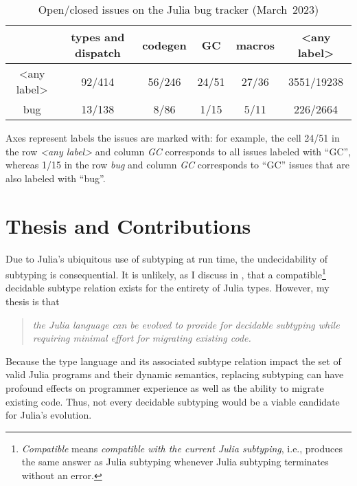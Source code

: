 \begin{table}[t]
\begin{threeparttable}
\centering\footnotesize
\caption{Open/closed issues on the Julia bug tracker
(March~2023)}\label{tab:julia-issues-stats}

\begin{tabular}{c|ccccc}
 & types and dispatch & codegen & GC & macros & <any label> \\
\midrule
<any label> &
  92/414 & 56/246 & 24/51 & 27/36 & 3551/19238 \\
bug &
  13/138 & 8/86 & 1/15 & 5/11 & 226/2664
\end{tabular}

\begin{tablenotes}[para]
\small
Axes represent labels the issues are marked with: for example, the cell
24/51 in the row \emph{<any label>} and column \emph{GC} corresponds to all
issues labeled with {``GC''}, whereas 1/15 in the row \emph{bug} and column 
\emph{GC} corresponds to {``GC''} issues that are also labeled with {``bug''}.
\end{tablenotes}
\end{threeparttable}
\end{table}

\section{Thesis and Contributions}

Due to Julia's ubiquitous use of subtyping at run time,
the undecidability of subtyping is consequential.
It is unlikely, as I discuss in ,
that a compatible\footnote{\emph{Compatible} means \emph{compatible with the
current Julia subtyping}, i.e., produces the same answer
as Julia subtyping whenever Julia subtyping terminates without an error.}
decidable subtype relation exists for the entirety of Julia
types. However, my thesis is that
\begin{quotation}\noindent\emph{%
  the Julia language can be evolved to provide for decidable subtyping while
  requiring minimal effort for migrating existing code.
}\end{quotation}

Because the type language and its associated subtype relation 
impact the set of valid Julia programs and their dynamic semantics,
replacing subtyping can have profound effects on programmer experience 
as well as the ability to migrate existing code.
Thus, not every decidable subtyping would be a viable candidate for
Julia's evolution.

